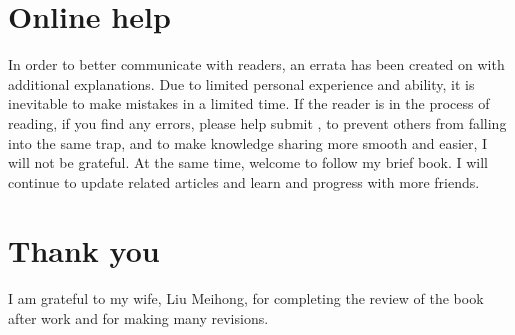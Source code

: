 





\section*{Online help}
\begin{content}
In order to better communicate with readers, an errata has been created on  with additional explanations. Due to limited personal experience and ability, it is inevitable to make mistakes in a limited time. If the reader is in the process of reading, if you find any errors, please help submit , to prevent others from falling into the same trap, and to make knowledge sharing more smooth and easier, I will not be grateful.
At the same time, welcome to follow my brief book. I will continue to update related articles and learn and progress with more friends.
\begin{enum}
\end{enum}
\end{content}


\section*{Thank you}
\begin{content}
I am grateful to my wife, Liu Meihong, for completing the review of the book after work and for making many revisions.
\end{content}
